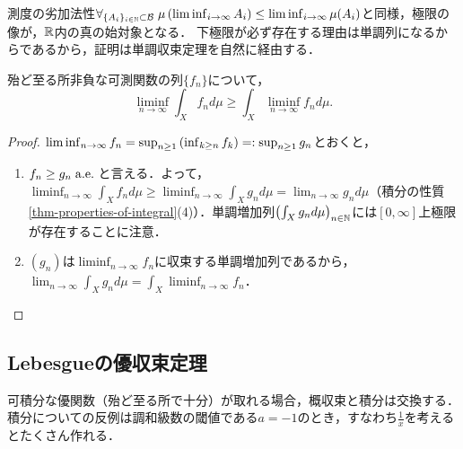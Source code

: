 \documentclass[uplatex, dvipdfmx]{jsreport}
\begin{document}
\begin{tcolorbox}[colframe=ForestGreen, colback=ForestGreen!10!white,breakable,colbacktitle=ForestGreen!40!white,coltitle=black,fonttitle=\bfseries\sffamily,
title=]
    測度の劣加法性$\forall_{\{A_i\}_{i\in\mathbb{N}}\subset\mathcal{B}}\;\mu\left(\liminf_{i\to\infty}A_i\right)\le\liminf_{i\to\infty}\mu(A_i)$と同様，極限の像が，$\mathbb{R}$内の真の始対象となる．
    下極限が必ず存在する理由は単調列になるからであるから，証明は単調収束定理を自然に経由する．
\end{tcolorbox}

\begin{theorem}[Fatou (1906)]
    殆ど至る所非負な可測関数の列$\{f_n\}$について，
    \[\liminf_{n\to\infty}\int_Xf_nd\mu\ge\int_X\liminf_{n\to\infty}f_nd\mu.\]
\end{theorem}
\begin{proof}
    $\liminf_{n\to\infty}f_n=\sup_{n\ge 1}\left(\inf_{k\ge n}f_k\right)=:\sup_{n\ge 1}g_n$とおくと，
    \begin{enumerate}
        \item $f_n\ge g_n\;\mathrm{a.e.}\;$と言える．よって，$\liminf_{n\to\infty}\int_Xf_nd\mu\ge\liminf_{n\to\infty}\int_Xg_nd\mu=\lim_{n\to\infty}g_nd\mu$（積分の性質\ref{thm-properties-of-integral}(4)）．単調増加列$\left(\int_Xg_nd\mu\right)_{n\in\mathbb{N}}$には$[0,\infty]$上極限が存在することに注意．
        \item  $(g_n)$は$\liminf_{n\to\infty}f_n$に収束する単調増加列であるから，$\lim_{n\to\infty}\int_Xg_nd\mu=\int_X\liminf_{n\to\infty}f_n$．
    \end{enumerate}
\end{proof}

\subsection{Lebesgueの優収束定理}

\begin{tcolorbox}[colframe=ForestGreen, colback=ForestGreen!10!white,breakable,colbacktitle=ForestGreen!40!white,coltitle=black,fonttitle=\bfseries\sffamily,
title=]
    可積分な優関数（殆ど至る所で十分）が取れる場合，概収束と積分は交換する．
    積分についての反例は調和級数の閾値である$a=-1$のとき，すなわち$\frac{1}{x}$を考えるとたくさん作れる．
\end{tcolorbox}
\end{document}

